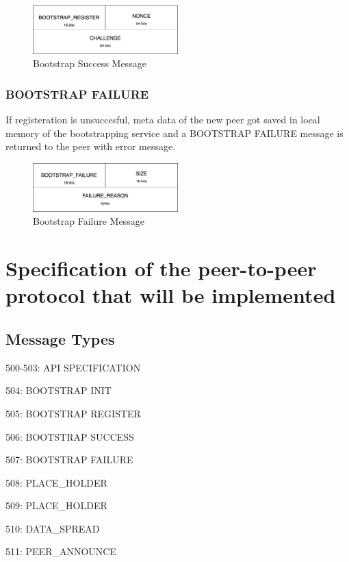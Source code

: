 \begin{figure}[H]
    \centering
    \includegraphics[width=0.5\textwidth]{pics/bootstrap.success.png}
    \caption{Bootstrap Success Message}
\end{figure}

\subsubsection{BOOTSTRAP FAILURE}
If registeration is unsuccesful, meta data of the new peer got saved in local memory of the bootstrapping service and a BOOTSTRAP FAILURE message is returned to the peer with error message. 

\begin{figure}[H]
    \centering
    \includegraphics[width=0.5\textwidth]{pics/bootstrap.failure.png}
    \caption{Bootstrap Failure Message}
\end{figure}




\section{Specification of the peer-to-peer protocol that will be implemented}

\subsection{Message Types}

500-503: API SPECIFICATION

504: BOOTSTRAP INIT

505: BOOTSTRAP REGISTER

506: BOOTSTRAP SUCCESS

507: BOOTSTRAP FAILURE


508: PLACE\_HOLDER

509: PLACE\_HOLDER


510: DATA\_SPREAD

511: PEER\_ANNOUNCE

